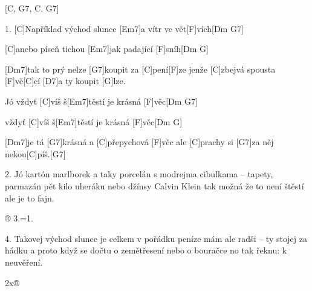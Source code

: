 
[C, G7, C, G7]

1. [C]Například východ slunce [Em7]a vítr ve vět[F]vích[Dm G7]

[C]anebo píseň tichou [Em7]jak padající [F]sníh[Dm G]

[Dm7]tak to prý nelze [G7]koupit za [C] pení[F]ze
jenže [C]zbejvá spousta [F]vě[C]cí [D7]a ty koupit [G]lze.

Jó vždyť [C]víš š[Em7]těstí je krásná [F]věc[Dm G7]

vždyť [C]víš š[Em7]těstí je krásná [F]věc[Dm G]

[Dm7] je tá [G7]krásná a [C]přepychová [F]věc
ale [C]prachy si [G7]za něj nekou[C]píš.[G7]


2. Jó kartón marlborek a taky porcelán
s modrejma cibulkama – tapety, parmazán
pět kilo uheráku nebo džínsy Calvin Klein
tak možná že to není štěstí ale je to fajn.

®
3.=1.

4. Takovej východ slunce je celkem v pořádku
peníze mám ale radši – ty stojej za hádku
a proto když se dočtu o zemětřesení
nebo o bouračce no tak řeknu: k neuvěření.

2x®